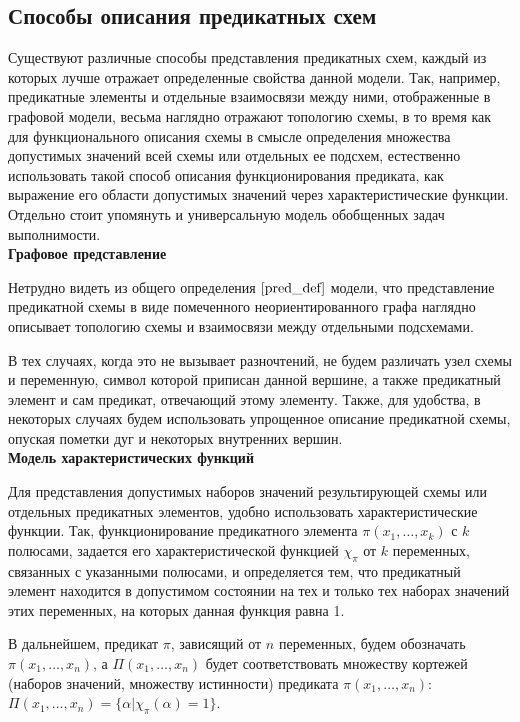 \documentclass[12pt]{article}
\begin{document}
\subsection{Способы описания предикатных схем}
Существуют различные способы представления предикатных схем, каждый из которых лучше отражает определенные свойства данной 
модели. Так, например, предикатные элементы и отдельные взаимосвязи между ними, отображенные в графовой модели,
весьма наглядно отражают топологию схемы, в то время как для функционального описания схемы в смысле 
определения множества допустимых значений 
всей схемы или отдельных ее подсхем, естественно использовать такой способ описания функционирования предиката,
как выражение его области допустимых значений через характеристические функции. 
Отдельно стоит упомянуть и универсальную модель обобщенных задач выполнимости.\\

\textbf{Графовое представление}

Нетрудно видеть из общего определения $\ref{pred_def}$ модели,
что представление предикатной схемы в виде помеченного неориентированного графа 
наглядно описывает топологию схемы и взаимосвязи 
между отдельными подсхемами.

В тех случаях, когда это не вызывает разночтений, не будем различать узел схемы и переменную, 
символ которой приписан данной вершине, а также предикатный элемент и сам предикат, отвечающий этому элементу. 
Также, для удобства, в некоторых случаях будем использовать упрощенное описание предикатной схемы, 
опуская пометки дуг и некоторых внутренних вершин.  \\

\textbf{Модель характеристических функций}

Для представления допустимых наборов значений результирующей схемы или отдельных предикатных элементов, 
удобно использовать характеристические
функции. Так, функционирование предикатного элемента $\pi(x_1, \dots, x_k)$ с $k$ полюсами,
задается его характеристической функцией $\chi_{\pi}$ от $k$ переменных, 
связанных с указанными полюсами, и определяется тем, что предикатный элемент находится в допустимом состоянии на тех и 
только тех наборах значений этих переменных, на которых данная функция равна 1. 

В дальнейшем, предикат $\pi$, зависящий от $n$ переменных, будем обозначать $\pi(x_1, \dots, x_n)$, а 
$\Pi(x_1, \dots, x_n)$ будет соответствовать множеству кортежей (наборов значений, множеству истинности) 
предиката $\pi(x_1, \dots, x_n)$: $\Pi(x_1, \dots, x_n) = \{ \alpha | \chi_{\pi}(\alpha) = 1 \}$.\\ 
\end{document}

